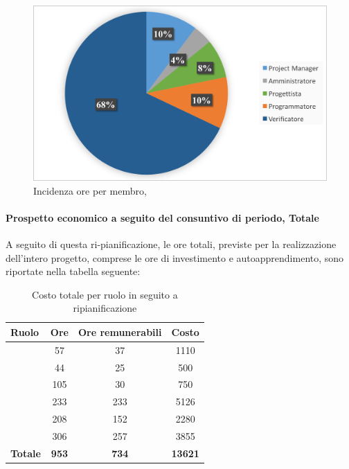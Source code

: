 \begin{figure}[H]
	\centering
	\includegraphics[scale=0.7]{Immagini/GraficiCONS/VVCONS.png}
	\caption{Incidenza ore per membro, \VV}
\end{figure}

\newpage
\paragraph{Prospetto economico a seguito del consuntivo di periodo, Totale}
A seguito di questa ri-pianificazione, le ore totali, previste per la realizzazione dell'intero progetto, comprese le ore di investimento e autoapprendimento, sono riportate nella tabella seguente:

\begin{table}[h]
	\begin{center}
		\begin{tabular}{|l|c|c|c|}
			\hline
			\textbf{Ruolo}	& \textbf{Ore} &	\textbf{Ore remunerabili}	 &\textbf{Costo} \\
			\hline
			\textit{\Pm}	&	57	&	37	&	1110	\\
			\hline
			\textit{\Am}	&	44	&	25	&	500	\\
			\hline
			\textit{\An}	&	105	&	30	&	750	\\
			\hline
			\textit{\Prog}	&	233	&	233	&	5126	\\
			\hline
			\textit{\Progr}	&	208	&	152	&	2280	\\
			\hline
			\textit{\Ver}	&	306	&	257	&	3855	\\
			\hline
			\textbf{Totale}	&	\textbf{953} & \textbf{734} & \textbf{13621}	\\
			\hline
		\end{tabular}
	\end{center}
	\caption{Costo totale per ruolo in seguito a ripianificazione}
\end{table}

